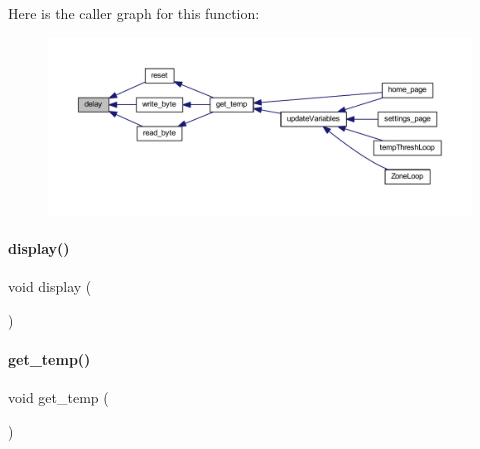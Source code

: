 Here is the caller graph for this function\+:
\nopagebreak
\begin{figure}[H]
\begin{center}
\leavevmode
\includegraphics[width=350pt]{a00050_a0bdd09d004d02b67ac952b8da05e8115_icgraph}
\end{center}
\end{figure}
\mbox{\label{a00050_a1e5b20fed15743656bb6d2e6a6ea6269}} 
\paragraph{display()}
{\footnotesize\ttfamily void display (\begin{DoxyParamCaption}{ }\end{DoxyParamCaption})}

\mbox{\label{a00050_a7c1c39f9031c3ab344bbd9fa8a85479e}} 
\paragraph{get\+\_\+temp()}
{\footnotesize\ttfamily void get\+\_\+temp (\begin{DoxyParamCaption}{ }\end{DoxyParamCaption})}

